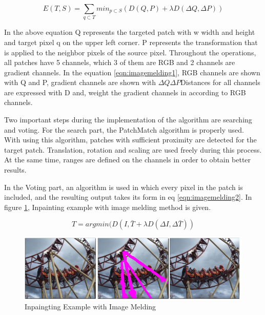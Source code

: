 \begin{equation}
    \label{eqn:imagemelding1}
    E(T,S) = \sum\limits_{q\subset T}{min_{p\subset S}(D(Q,P)+\lambda D(\Delta Q, \Delta P))}
\end{equation}

In the above equation Q represents the targeted patch with w width and height and target pixel q on the upper left corner. P represents the transformation that is applied to the neighbor pixels of the source pixel. Throughout the operations, all patches have 5 channels, which 3 of them are RGB and 2 channels are gradient channels. In the equation \ref{eqn:imagemelding1}, RGB channels are shown with Q and P, gradient channels are shown with \(\Delta Q \Delta P \)Distances for all channels are expressed with D and,  weight the gradient channels in according to RGB channels.

Two important steps during the implementation of the algorithm are searching and voting. For the search part, the PatchMatch algorithm is properly used. With using this algorithm, patches with sufficient proximity are detected for the target patch. Translation, rotation and scaling are used freely during this process. At the same time, ranges are defined on the channels in order to obtain better results.

In the Voting part, an algorithm is used in which every pixel in the patch is included, and the resulting output takes its form in eq \ref{eqn:imagemelding2}. In figure \ref{fig:inpainting-image-melding}, Inpainting example with image melding method is given.

\begin{equation}
    \label{eqn:imagemelding2}
    T= argmin(D(I,\bar{T}+\lambda D(\Delta I,\Delta \bar{T}))
\end{equation}

\begin{figure}[h]
    \centering
    \includegraphics{figures/chapter2/ImageMeldingExample.png}
    \caption{Inpaingting Example with Image Melding}
    \label{fig:inpainting-image-melding}
\end{figure}

